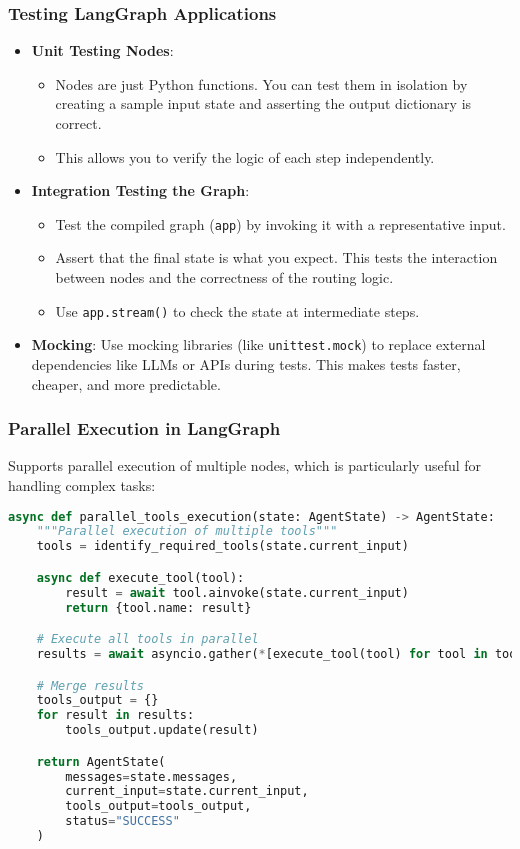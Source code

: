 \begin{frame}[fragile]\frametitle{Testing LangGraph Applications}
      \begin{itemize}
        \item \textbf{Unit Testing Nodes}:
        \begin{itemize}
            \item Nodes are just Python functions. You can test them in isolation by creating a sample input state and asserting the output dictionary is correct.
            \item This allows you to verify the logic of each step independently.
        \end{itemize}
        \item \textbf{Integration Testing the Graph}:
        \begin{itemize}
            \item Test the compiled graph (\texttt{app}) by invoking it with a representative input.
            \item Assert that the final state is what you expect. This tests the interaction between nodes and the correctness of the routing logic.
            \item Use \texttt{app.stream()} to check the state at intermediate steps.
        \end{itemize}
        \item \textbf{Mocking}: Use mocking libraries (like \texttt{unittest.mock}) to replace external dependencies like LLMs or APIs during tests. This makes tests faster, cheaper, and more predictable.
      \end{itemize}
\end{frame}

\begin{frame}[fragile]\frametitle{Parallel Execution in LangGraph}
Supports parallel execution of multiple nodes, which is particularly useful for handling complex tasks:

      \begin{lstlisting}[language=Python, basicstyle=\tiny]
async def parallel_tools_execution(state: AgentState) -> AgentState:
    """Parallel execution of multiple tools"""
    tools = identify_required_tools(state.current_input)

    async def execute_tool(tool):
        result = await tool.ainvoke(state.current_input)
        return {tool.name: result}

    # Execute all tools in parallel
    results = await asyncio.gather(*[execute_tool(tool) for tool in tools])

    # Merge results
    tools_output = {}
    for result in results:
        tools_output.update(result)

    return AgentState(
        messages=state.messages,
        current_input=state.current_input,
        tools_output=tools_output,
        status="SUCCESS"
    )
      \end{lstlisting}
\end{frame}


